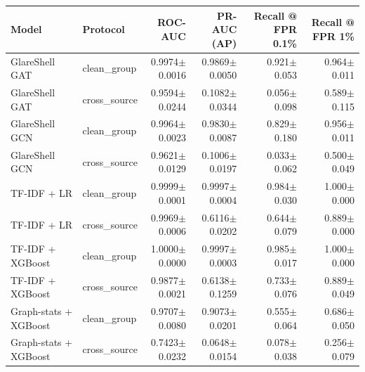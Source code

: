 \begin{tabular}{@{}llrrrr@{}}
\toprule
Model & Protocol & ROC-AUC & PR-AUC (AP) & Recall @ FPR 0.1\% & Recall @ FPR 1\% \\ \midrule
GlareShell GAT & clean\_group & 0.9974$\pm$0.0016 & 0.9869$\pm$0.0050 & 0.921$\pm$0.053 & 0.964$\pm$0.011 \\
GlareShell GAT & cross\_source & 0.9594$\pm$0.0244 & 0.1082$\pm$0.0344 & 0.056$\pm$0.098 & 0.589$\pm$0.115 \\
GlareShell GCN & clean\_group & 0.9964$\pm$0.0023 & 0.9830$\pm$0.0087 & 0.829$\pm$0.180 & 0.956$\pm$0.011 \\
GlareShell GCN & cross\_source & 0.9621$\pm$0.0129 & 0.1006$\pm$0.0197 & 0.033$\pm$0.062 & 0.500$\pm$0.049 \\
TF-IDF + LR & clean\_group & 0.9999$\pm$0.0001 & 0.9997$\pm$0.0004 & 0.984$\pm$0.030 & 1.000$\pm$0.000 \\
TF-IDF + LR & cross\_source & 0.9969$\pm$0.0006 & 0.6116$\pm$0.0202 & 0.644$\pm$0.079 & 0.889$\pm$0.000 \\
TF-IDF + XGBoost & clean\_group & 1.0000$\pm$0.0000 & 0.9997$\pm$0.0003 & 0.985$\pm$0.017 & 1.000$\pm$0.000 \\
TF-IDF + XGBoost & cross\_source & 0.9877$\pm$0.0021 & 0.6138$\pm$0.1259 & 0.733$\pm$0.076 & 0.889$\pm$0.049 \\
Graph-stats + XGBoost & clean\_group & 0.9707$\pm$0.0080 & 0.9073$\pm$0.0201 & 0.555$\pm$0.064 & 0.686$\pm$0.050 \\
Graph-stats + XGBoost & cross\_source & 0.7423$\pm$0.0232 & 0.0648$\pm$0.0154 & 0.078$\pm$0.038 & 0.256$\pm$0.079 \\
\bottomrule
\end{tabular}
